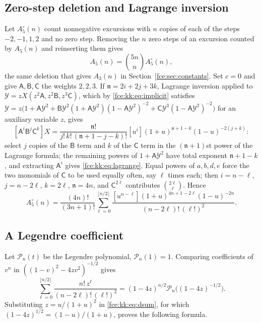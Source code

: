 \documentclass[11pt,a4paper]{article}
\numberwithin{equation}{section}
\theoremstyle{definition}\newtheorem{definition}[theorem]{Definition}
\theoremstyle{remark}\newtheorem{remark}[theorem]{Remark}
\begin{document}
\subsection{Zero-step deletion and Lagrange inversion}
Let $A^\circ_5(n)$ count nonnegative excursions with $n$ copies of each of
the steps $-2,-1,1,2$ and no zero step. Removing the $n$ zero steps of an
excursion counted by $A_5(n)$ and reinserting them gives
\begin{equation}\label{fce:kk:eq:zeroinsert}
 A_5(n)=\binom{5n}{n}A^\circ_5(n),
\end{equation}
the same deletion that gives $A_3(n)$ in Section~\ref{fce:sec:constants}.
Set $c=0$ and give $\mathsf A,\mathsf B,\mathsf C$ the weights $2,2,3$. If
$\mathfrak n=2i+2j+3k$, Lagrange inversion applied to
$\mathcal Y=zX(z^2\mathsf A,z^2\mathsf B,z^3\mathsf C)$, which by
\eqref{fce:kk:eq:implicit} satisfies
$\mathcal Y=z\bigl(1+\mathsf A\mathcal Y^2+\mathsf B\mathcal Y^2(1+\mathsf A\mathcal Y^2)(1-\mathsf A\mathcal Y^2)^{-2}+\mathsf C\mathcal Y^3(1-\mathsf A\mathcal Y^2)^{-2}\bigr)$
for an auxiliary variable $z$, gives
\begin{equation}\label{fce:kk:eq:lagrange}
 [\mathsf A^i\mathsf B^j\mathsf C^k]X=
 \frac{\mathfrak n!}{j!\,k!\,(\mathfrak n+1-j-k)!}
 [u^i](1+u)^{\mathfrak n+1-k}(1-u)^{-2(j+k)}:
\end{equation}
select $j$ copies of the $\mathsf B$ term and $k$ of the $\mathsf C$ term in
the $(\mathfrak n+1)$st power of the Lagrange formula; the remaining powers
of $1+\mathsf A\mathcal Y^2$ have total exponent $\mathfrak n+1-k$, and
extracting $\mathsf A^i$ gives \eqref{fce:kk:eq:lagrange}. Equal powers of
$a,b,d,e$ force the two monomials of $\mathsf C$ to be used equally often,
say $\ell$ times each; then $i=n-\ell$, $j=n-2\ell$, $k=2\ell$, $\mathfrak
n=4n$, and $\mathsf C^{2\ell}$ contributes $\binom{2\ell}\ell$. Hence
\begin{equation}\label{fce:kk:eq:dsum}
 A^\circ_5(n)=\frac{(4n)!}{(3n+1)!}
 \sum_{\ell=0}^{\lfloor n/2\rfloor}
 \frac{[u^{n-\ell}](1+u)^{4n+1-2\ell}(1-u)^{-2n}}{(n-2\ell)!\,(\ell!)^2}.
\end{equation}

\subsection{A Legendre coefficient}
Let $\mathcal P_n(t)$ be the Legendre polynomial, $\mathcal P_n(1)=1$.
Comparing coefficients of $v^n$ in $((1-v)^2-4zv^2)^{-1/2}$ gives
\[
 \sum_{\ell=0}^{\lfloor n/2\rfloor}\frac{n!\,z^\ell}{(n-2\ell)!\,(\ell!)^2}
 =(1-4z)^{n/2}\mathcal P_n\bigl((1-4z)^{-1/2}\bigr).
\]
Substituting $z=u/(1+u)^2$ in \eqref{fce:kk:eq:dsum}, for which
$(1-4z)^{1/2}=(1-u)/(1+u)$, proves the following formula.
\end{document}
